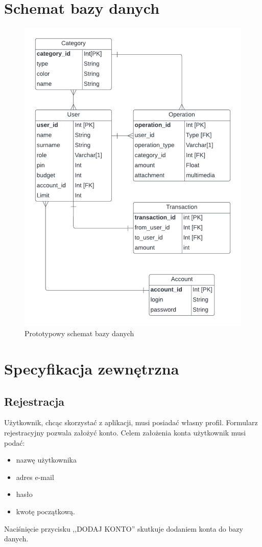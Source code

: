 \documentclass[12pt,a4paper,oneside]{article}
\begin{document}
\section{Schemat bazy danych}
\begin{figure}[H]
    \centering
    \includegraphics[width=\hsize,keepaspectratio]{images/DB1.png}
    \caption{Prototypowy schemat bazy danych}
\end{figure}

\section{Specyfikacja zewnętrzna}
\subsection{Rejestracja}
Użytkownik, chcąc skorzystać z aplikacji, musi posiadać własny profil. Formularz
rejestracyjny pozwala założyć konto. Celem założenia konta użytkownik musi podać:
\begin{itemize}
    \item nazwę użytkownika
    \item adres e-mail
    \item hasło
    \item kwotę początkową.
\end{itemize}
Naciśnięcie przycisku ,,DODAJ KONTO'' skutkuje dodaniem konta do bazy danych.
\end{document}
